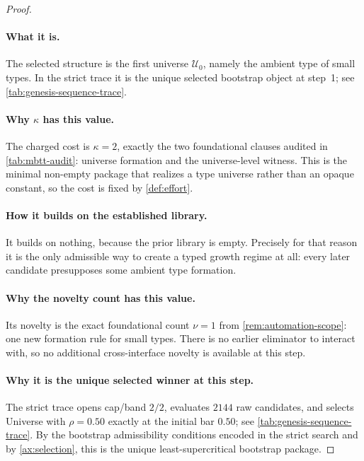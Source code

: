 \documentclass[11pt,a4paper]{article}
\theoremstyle{plain}
\theoremstyle{definition}
\theoremstyle{remark}
\newcommand{\U}{\mathcal{U}}
\begin{document}
\begin{proof}
\paragraph{What it is.}
The selected structure is the first universe $\U_0$, namely the ambient type of
small types.
In the strict trace it is the unique selected bootstrap object at step~1; see
\cref{tab:genesis-sequence-trace}.

\paragraph{Why $\kappa$ has this value.}
The charged cost is $\kappa=2$, exactly the two foundational clauses audited in
\cref{tab:mbtt-audit}: universe formation and the universe-level witness.
This is the minimal non-empty package that realizes a type universe rather than
an opaque constant, so the cost is fixed by \cref{def:effort}.

\paragraph{How it builds on the established library.}
It builds on nothing, because the prior library is empty.
Precisely for that reason it is the only admissible way to create a typed growth
regime at all: every later candidate presupposes some ambient type formation.

\paragraph{Why the novelty count has this value.}
Its novelty is the exact foundational count $\nu=1$ from
\cref{rem:automation-scope}: one new formation rule for small types.
There is no earlier eliminator to interact with, so no additional
cross-interface novelty is available at this step.

\paragraph{Why it is the unique selected winner at this step.}
The strict trace opens cap/band $2/2$, evaluates $2144$ raw candidates, and
selects Universe with $\rho=0.50$ exactly at the initial bar $0.50$; see
\cref{tab:genesis-sequence-trace}.
By the bootstrap admissibility conditions encoded in the strict search and by
\cref{ax:selection}, this is the unique least-supercritical bootstrap package.
\end{proof}
\end{document}
